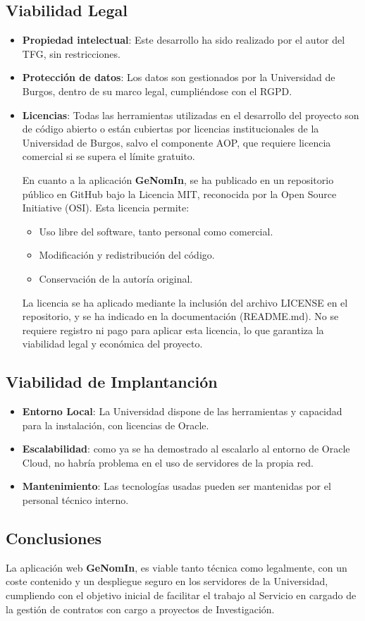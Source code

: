 \subsection{Viabilidad Legal}
\begin{itemize}
	\item \textbf{Propiedad intelectual}: Este desarrollo ha sido realizado por el autor del \acrshort{TFG}, sin restricciones.
	\item \textbf{Protección de datos}: Los datos son gestionados por la Universidad de Burgos, dentro de su marco legal, cumpliéndose con el \acrshort{RGPD}.
	\item \textbf{Licencias}: Todas las herramientas utilizadas en el desarrollo del proyecto son de código abierto o están cubiertas por licencias institucionales de la Universidad de Burgos, salvo el componente \acrshort{AOP}, que requiere licencia comercial si se supera el límite gratuito.
	
	En cuanto a la aplicación \textbf{GeNomIn}, se ha publicado en un repositorio público en GitHub bajo la \gls{Licencia MIT}, reconocida por la Open Source Initiative (OSI). Esta licencia permite:
	\begin{itemize}
		\item Uso libre del software, tanto personal como comercial.
		\item Modificación y redistribución del código.
		\item Conservación de la autoría original.
	\end{itemize}	
	
	La licencia se ha aplicado mediante la inclusión del archivo LICENSE en el repositorio, y se ha indicado en la documentación (README.md). No se requiere registro ni pago para aplicar esta licencia, lo que garantiza la viabilidad legal y económica del proyecto.
\end{itemize}
\subsection{Viabilidad de Implantanción}
\begin{itemize}
	\item \textbf{Entorno Local}: La Universidad dispone de las herramientas y capacidad para la instalación, con licencias de Oracle.
	\item \textbf{Escalabilidad}: como ya se ha demostrado al escalarlo al entorno de Oracle Cloud, no habría problema en el uso de servidores de la propia red.
	\item \textbf{Mantenimiento}: Las tecnologías usadas pueden ser mantenidas por el personal técnico interno.
\end{itemize}
\subsection{Conclusiones} La aplicación web \textbf{GeNomIn}, es viable tanto técnica como legalmente, con un coste contenido y un despliegue seguro en los servidores de la Universidad, cumpliendo con el objetivo inicial de facilitar el trabajo al Servicio en cargado de la gestión de contratos con cargo a proyectos de Investigación.

